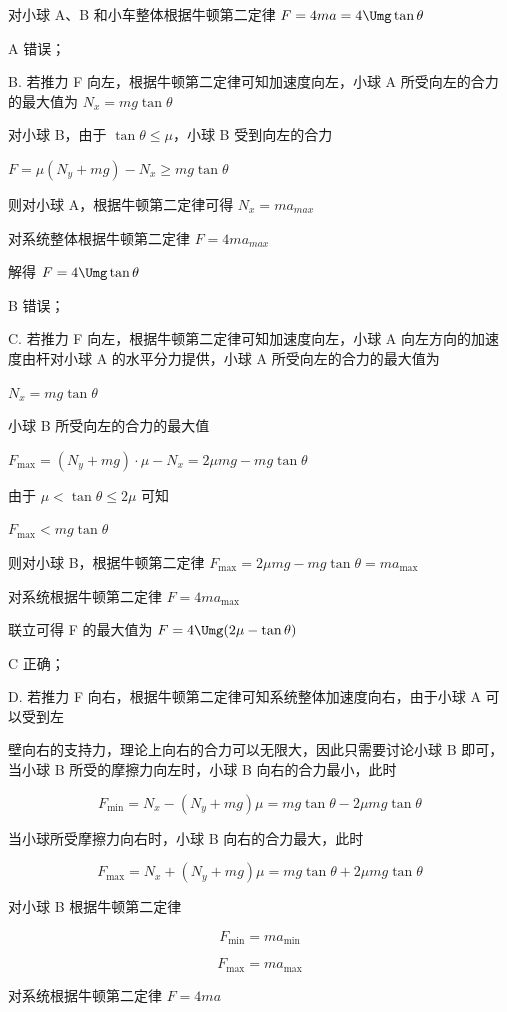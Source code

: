 \documentclass[\gkver]{gaokaozhenti}
\begin{document}
\begin{enumerate}
{对小球 A、B 和小车整体根据牛顿第二定律  $F = 4ma = 4\Umg \tan \theta$

A 错误；

B. 若推力 F 向左，根据牛顿第二定律可知加速度向左，小球 A 所受向左的合力的最大值为  $N_{x}=mg\tan\theta$

对小球 B，由于  $\tan\theta \leq \mu$，小球 B 受到向左的合力

 $F = \mu (N_y + mg) - N_x \geq mg \tan \theta$

则对小球 A，根据牛顿第二定律可得  $N_{x}=ma_{max}$

对系统整体根据牛顿第二定律  $F = 4ma_{max}$

解得  $F = 4\Umg \tan \theta$

B 错误；

C. 若推力 F 向左，根据牛顿第二定律可知加速度向左，小球 A 向左方向的加速度由杆对小球 A 的水平分力提供，小球 A 所受向左的合力的最大值为

 $N_{x}=mg\tan\theta$

小球 B 所受向左的合力的最大值

 $F_{\max} = (N_y + mg) \cdot \mu - N_x = 2\mu mg - mg \tan \theta$

由于  $\mu < \tan \theta \leq 2\mu$ 可知

 $F_{\max} < mg \tan \theta$

则对小球 B，根据牛顿第二定律  $F_{\max} = 2\mu mg - mg \tan \theta = ma_{\max}$

对系统根据牛顿第二定律  $F = 4ma_{\max}$

联立可得 F 的最大值为  $F = 4\Umg(2\mu - \tan\theta)$

C 正确；

D. 若推力 F 向右，根据牛顿第二定律可知系统整体加速度向右，由于小球 A 可以受到左

壁向右的支持力，理论上向右的合力可以无限大，因此只需要讨论小球 B 即可，当小球 B 所受的摩擦力向左时，小球 B 向右的合力最小，此时

$$ F _ {\min} = N _ {x} - (N _ {y} + m g) \mu = m g \tan \theta - 2 \mu m g \tan \theta $$

当小球所受摩擦力向右时，小球 B 向右的合力最大，此时

$$ F _ {\max} = N _ {x} + (N _ {y} + m g) \mu = m g \tan \theta + 2 \mu m g \tan \theta $$

对小球 B 根据牛顿第二定律

$$ F _ {\min} = m a _ {\min} $$

$$ F _ {\max} = m a _ {\max} $$

对系统根据牛顿第二定律 $F = 4ma$

}
\end{enumerate}
\end{document}
